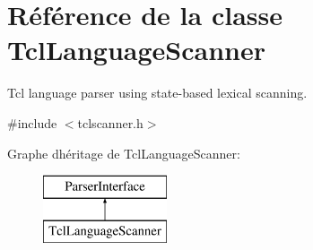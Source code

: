 \hypertarget{class_tcl_language_scanner}{}\section{Référence de la classe Tcl\+Language\+Scanner}
\label{class_tcl_language_scanner}


Tcl language parser using state-\/based lexical scanning.  




{\ttfamily \#include $<$tclscanner.\+h$>$}

Graphe d\textquotesingle{}héritage de Tcl\+Language\+Scanner\+:\begin{figure}[H]
\begin{center}
\leavevmode
\includegraphics[height=2.000000cm]{class_tcl_language_scanner}
\end{center}
\end{figure}
